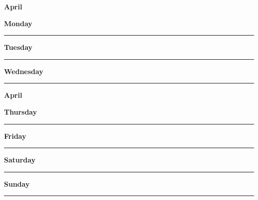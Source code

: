 \newpage

\textbf{\Large{April} \hfill \Large{}}
\vspace{0.3cm}

\begin{daybox}
 \textbf{Monday} \\
\rule{\linewidth}{0.02cm}
\end{daybox}

\begin{daybox}
\textbf{Tuesday} \\
\rule{\linewidth}{0.02cm}
\end{daybox}

\begin{daybox}
\textbf{Wednesday} \\
\rule{\linewidth}{0.02cm}
\end{daybox}

\newpage

\textbf{\Large{April} \hfill \Large{}}
\vspace{0.3cm}

\begin{daybox}
\textbf{Thursday} \\
\rule{\linewidth}{0.02cm}
\end{daybox}

\begin{daybox}
\textbf{Friday} \\
\rule{\linewidth}{0.02cm}
\end{daybox}

\begin{weekendbox}
\textbf{Saturday} \\
\rule{\linewidth}{0.02cm}
\tcblower
{}
\textbf{Sunday} \\
\rule{\linewidth}{0.02cm}
\end{weekendbox}